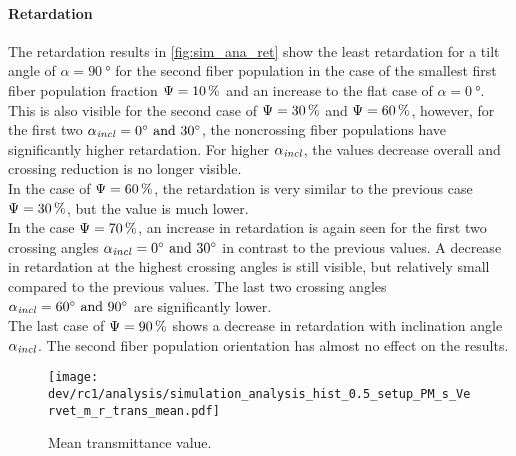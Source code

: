 \paragraph{Retardation}
The retardation results in \cref{fig:sim_ana_ret} show the least retardation for a tilt angle of $\alpha=\SI{90}{\degree}$ for the second fiber population in the case of the smallest first fiber population fraction $\textnormal{$\Psi$}=\SI{10}{\percent}$ and an increase to the flat case of $\alpha=\SI{0}{\degree}$.
\\
%
This is also visible for the second case of $\textnormal{$\Psi$}=\SI{30}{\percent}$ and $\textnormal{$\Psi$}=\SI{60}{\percent}$, however, for the first two $\modelInc = \SIlist{0;30}{\degree}$, the noncrossing fiber populations have significantly higher retardation.
For higher $\textnormal{$\alpha_{\mathit{incl}}$}$, the values decrease overall and crossing reduction is no longer visible.
\\
%
In the case of $\textnormal{$\Psi$}=\SI{60}{\percent}$, the retardation is very similar to the previous case $\textnormal{$\Psi$}=\SI{30}{\percent}$, but the value is much lower.
\\
%
In the case $\textnormal{$\Psi$}=\SI{70}{\percent}$, an increase in retardation is again seen for the first two crossing angles $\modelInc=\SIlist{0;30}{\degree}$ in contrast to the previous values.
A decrease in retardation at the highest crossing angles is still visible, but relatively small compared to the previous values.
The last two crossing angles $\modelInc=\SIlist{60;90}{\degree}$ are significantly lower.
\\
%
The last case of $\textnormal{$\Psi$}=\SI{90}{\percent}$ shows a decrease in retardation with inclination angle $\textnormal{$\alpha_{\mathit{incl}}$}$.
The second fiber population orientation has almost no effect on the results.
%
%
%
\begin{figure}[!p]
\centering
\texttt{[image: dev/rc1/analysis/simulation\_analysis\_hist\_0.5\_setup\_PM\_s\_Vervet\_m\_r\_trans\_mean.pdf]}
\caption[Simulation transmittance]{Mean transmittance value.}
\label{fig:sim_ana_trans}
\end{figure}
%
